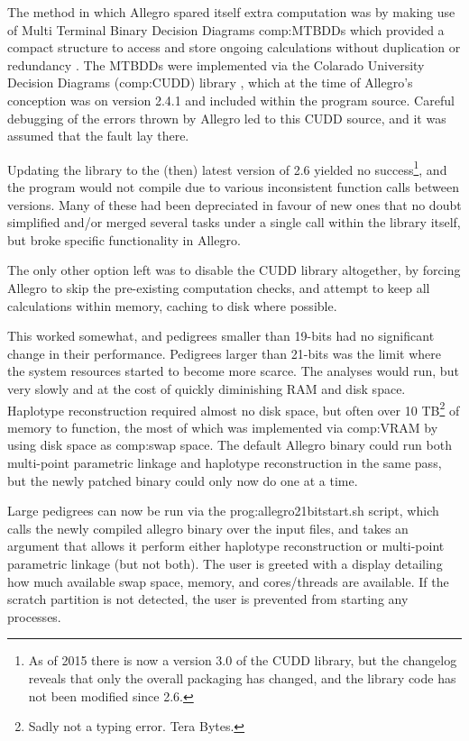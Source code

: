 The method in which Allegro spared itself extra computation was by making use of Multi Terminal Binary Decision Diagrams \gls{comp:MTBDD}s   which provided a compact structure to access and store ongoing calculations without duplication or redundancy \cite{mtbdd}. The MTBDDs were implemented via the Colarado University Decision Diagrams (\gls{comp:CUDD}) library \citep{cudd}, which at the time of Allegro's conception was on version 2.4.1 and included within the program source.  Careful debugging of the errors thrown by Allegro led to this CUDD source, and it was assumed that the fault lay there.

Updating the library to the (then) latest version of 2.6 yielded no success\footnote{As of 2015 there is now a version 3.0 of the CUDD library, but the changelog  reveals that only the overall packaging has changed, and the library code has not been modified since 2.6.}, and the program would not compile due to various inconsistent function calls between versions. Many of these had been depreciated in favour of new ones that no doubt simplified and/or merged several tasks under a single call within the library itself, but broke specific functionality in Allegro.

The only other option left was to disable the CUDD library altogether, by forcing Allegro to skip the pre-existing computation checks, and attempt to keep all calculations within memory, caching to disk where possible.

This worked somewhat, and pedigrees smaller than 19-bits had no significant change in their performance. Pedigrees larger than 21-bits was the limit where the system resources started to become more scarce. The analyses would run, but very slowly and at the cost of quickly diminishing RAM and disk space. Haplotype reconstruction required almost no disk space, but often over 10 TB\footnote{Sadly not a typing error. Tera Bytes.} of memory to function, the most of which was implemented via \gls{comp:VRAM} by using disk space as \gls{comp:swap space}. The default Allegro binary could run both multi-point parametric linkage and haplotype reconstruction in the same pass, but the newly patched binary could only now do one at a time.

Large pedigrees can now be run via the \gls{prog:allegro21bitstart.sh} script, which calls  the newly compiled allegro binary over the input files, and takes an argument that allows it perform either haplotype reconstruction or multi-point parametric linkage (but not both). The user is greeted with a display detailing how much available swap space, memory, and cores/threads are available. If the scratch partition is not detected, the user is prevented from starting any processes. 

